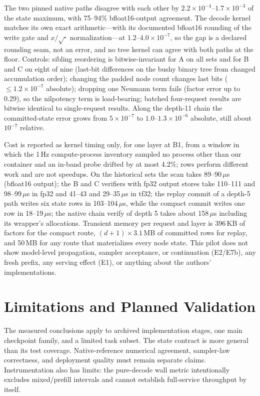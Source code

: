 \documentclass[conference]{IEEEtran}
\begin{document}
The two pinned native paths disagree with each other by $2.2\times10^{-4}$--$1.7\times10^{-3}$ of the state maximum, with 75--94\% bfloat16-output agreement. The decode kernel matches its own exact arithmetic---with its documented bfloat16 rounding of the write gate and $x/\sqrt{\cdot}$ normalization---at $1.2$--$4.0\times10^{-7}$, so the gap is a declared rounding seam, not an error, and no tree kernel can agree with both paths at the floor. Controls: sibling reordering is bitwise-invariant for A on all sets and for B and C on eight of nine (last-bit differences on the bushy binary tree from changed accumulation order); changing the padded node count changes last bits ($\le1.2\times10^{-7}$ absolute); dropping one Neumann term fails (factor error up to 0.29), so the nilpotency term is load-bearing; batched four-request results are bitwise identical to single-request results. Along the depth-11 chain the committed-state error grows from $5\times10^{-7}$ to $1.0$--$1.3\times10^{-6}$ absolute, still about $10^{-7}$ relative.

Cost is reported as kernel timing only, for one layer at B1, from a window in which the 1\,Hz compute-process inventory sampled no process other than our container and an in-band probe drifted by at most 4.2\%; rows perform different work and are not speedups. On the historical sets the scan takes 89--90\,$\mu$s (bfloat16 output); the B and C verifiers with fp32 output stores take 110--111 and 98--99\,$\mu$s in fp32 and 41--43 and 29--35\,$\mu$s in tf32; the replay commit of a depth-5 path writes six state rows in 103--104\,$\mu$s, while the compact commit writes one row in 18--19\,$\mu$s; the native chain verify of depth 5 takes about 158\,$\mu$s including its wrapper's allocations. Transient memory per request and layer is 396\,KB of factors for the compact route, $(d{+}1)\times3.1$\,MB of committed rows for replay, and 50\,MB for any route that materializes every node state. This pilot does not show model-level propagation, sampler acceptance, or continuation (E2/E7b), any fresh prefix, any serving effect (E1), or anything about the authors' implementations.

\section{Limitations and Planned Validation}
\label{sec:planned}
The measured conclusions apply to archived implementation stages, one main checkpoint family, and a limited task subset. The state contract is more general than its test coverage. Native-reference numerical agreement, sampler-law correctness, and deployment quality must remain separate claims. Instrumentation also has limits: the pure-decode wall metric intentionally excludes mixed/prefill intervals and cannot establish full-service throughput by itself.
\end{document}
